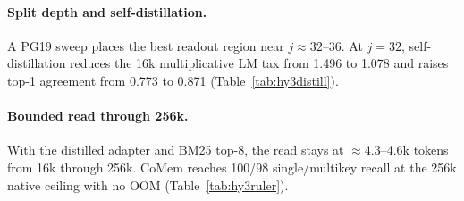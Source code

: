 \paragraph{Split depth and self-distillation.}
A PG19 sweep places the best readout region near $j\approx32$--36. At $j=32$,
self-distillation reduces the 16k multiplicative LM tax from 1.496 to 1.078 and
raises top-1 agreement from 0.773 to 0.871
(Table~\ref{tab:hy3distill}).



\paragraph{Bounded read through 256k.}
With the distilled adapter and BM25 top-8, the read stays at
$\approx4.3$--4.6k tokens from 16k through 256k. CoMem reaches 100/98
single/multikey recall at the 256k native ceiling with no OOM
(Table~\ref{tab:hy3ruler}).


